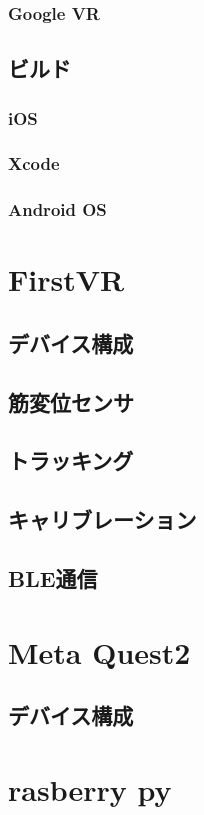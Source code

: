 \documentclass{ltjsreport}
\begin{document}
			\subsubsection{Google VR}
		\subsection{ビルド}
			\subsubsection{iOS}
			\subsubsection{Xcode}
			\subsubsection{Android OS}
	\section{FirstVR}
		\subsection{デバイス構成}
		\subsection{筋変位センサ}
		\subsection{トラッキング}
		\subsection{キャリブレーション}
		\subsection{BLE通信}
	\section{Meta Quest2}
		\subsection{デバイス構成}
	\section{rasberry py}
	
\end{document}
